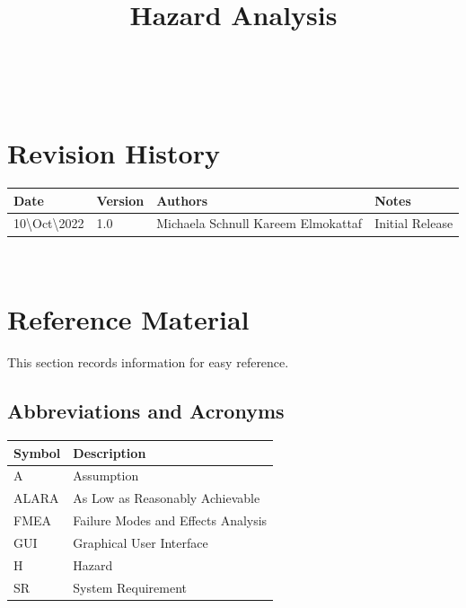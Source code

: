\documentclass[12pt]{article}
\title{Hazard Analysis\\\progname}
\author{\authname}
\date{}
\begin{document}

\maketitle

\newpage

\tableofcontents
\listoffigures
\listoftables

~\newpage

\section*{Revision History}

\begin{tabularx}{1.0\textwidth}{p{3cm}p{2cm}p{4cm}X}
\toprule {\bf Date} & {\bf Version} & {\bf Authors} & {\bf Notes}\\
\midrule
10\textbackslash Oct\textbackslash 2022 & 1.0 & Michaela Schnull \newline Kareem Elmokattaf  & Initial Release\\
\bottomrule
\end{tabularx}

~\newpage

\section{Reference Material}

This section records information for easy reference.

\subsection{Abbreviations and Acronyms}

\renewcommand{\arraystretch}{1.2}
\begin{tabular}{l l} 
  \toprule		
  \textbf{Symbol} & \textbf{Description}\\
  \midrule 
  A & Assumption\\
  ALARA & As Low as Reasonably Achievable\\
  FMEA & Failure Modes and Effects Analysis\\
  GUI & Graphical User Interface\\
  H & Hazard\\
  SR & System Requirement\\
  \bottomrule
\end{tabular}\\
\end{document}
